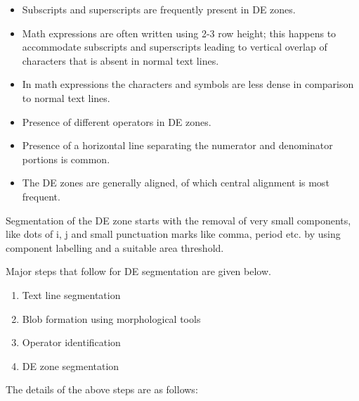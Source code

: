 \documentclass[oneside,a4paper,12pt]{book}
\begin{document}
\begin{itemize}
\item Subscripts and superscripts are frequently present in DE zones.
\item Math expressions are often written using 2-3 row height; this happens to accommodate subscripts and superscripts
leading to vertical overlap of characters that is absent in  normal text lines.
\item In math expressions the characters and symbols are less dense in comparison to normal text lines.
 \item Presence of different operators in DE zones.
 \item Presence of a horizontal line separating the numerator and denominator portions is common.
 \item The DE zones are generally aligned, of which central alignment is most frequent.
 \end{itemize}

Segmentation of the DE zone starts with the removal of 
very small components, like dots of i,  j and small
punctuation marks  like comma,  period etc. by using component labelling and a suitable area threshold.

Major steps that follow for DE segmentation are given below.
\begin{enumerate}
\item Text line segmentation
\item Blob formation using morphological tools
\item Operator identification
\item DE zone segmentation
\end{enumerate}
The details of the above steps are as follows:
\end{document}
